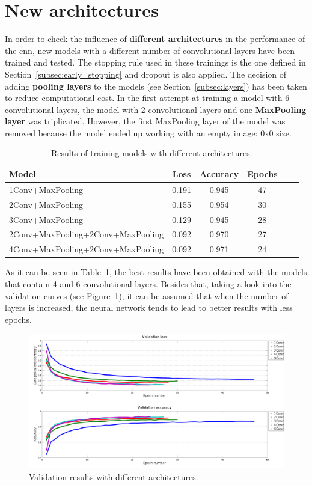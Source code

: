 \section{New architectures}\label{subsec:arch}
In order to check the influence of \textbf{different architectures} in the performance of the \gls{cnn}, new models with a different number of convolutional layers have been trained and tested. The stopping rule used in these trainings is the one defined in Section~\ref{subsec:early_stopping} and dropout is also applied. The decision of adding \textbf{pooling layers} to the models (see Section~\ref{subsec:layers}) has been taken to reduce computational cost. In the first attempt at training a model with 6 convolutional layers, the model with 2 convolutional layers and one \textbf{MaxPooling layer} was triplicated. However, the first MaxPooling layer of the model was removed because the model ended up working with an empty image: 0x0 size.
\begin{table}
	\centering
	\begin{tabular}{l*{4}{c}r}
		\textbf{Model} & \textbf{Loss} & \textbf{Accuracy} & \textbf{Epochs} \\
		\hline
		1Conv+MaxPooling & 0.191 & 0.945 & 47 \\
		2Conv+MaxPooling & 0.155 & 0.954 & 30 \\
		3Conv+MaxPooling & 0.129 & 0.945 & 28 \\
		2Conv+MaxPooling+2Conv+MaxPooling & 0.092 & 0.970 & 27 \\
		4Conv+MaxPooling+2Conv+MaxPooling & 0.092 & 0.971 & 24 \\
	\end{tabular}
	\caption{Results of training models with different architectures.}
	\label{tbl:arch}
\end{table}

As it can be seen in Table~\ref{tbl:arch}, the best results have been obtained with the models that contain 4 and 6 convolutional layers. Besides that, taking a look into the validation curves (see Figure~\ref{fig:comp_arch}), it can be assumed that when the number of layers is increased, the neural network tends to lead to better results with less epochs.

\begin{figure}
	\centering
	\includegraphics[width=1\linewidth, keepaspectratio]{figures/full_comparison.png}
	\caption{Validation results with different architectures.}
	\label{fig:comp_arch}
\end{figure}

